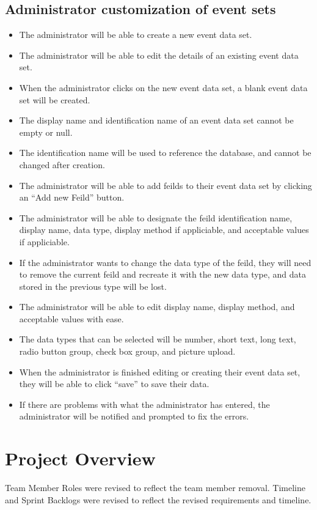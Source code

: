 \subsection{Administrator customization of event sets}
\begin{itemize}
\item The administrator will be able to create a new event data set.
\item The administrator will be able to edit the details of an existing event data set.
\item When the administrator clicks on the new event data set, a blank event data set will be created. 
\item The display name and identification name of an event data set cannot be empty or null.
\item The identification name will be used to reference the database, and cannot be changed after creation.
\item The administrator will be able to add feilds to their event data set by clicking an ``Add new Feild'' button.
\item The administrator will be able to designate the feild identification name, display name, data type, display method if appliciable, and acceptable values if appliciable. 
\item If the administrator wants to change the data type of the feild, they will need to remove the current feild and recreate it with the new data type, and data stored in the previous type will be lost.
\item The administrator will be able to edit display name, display method, and acceptable values with ease.
\item The data types that can be selected will be number, short text, long text, radio button group, check box group, and picture upload.
\item When the administrator is finished editing or creating their event data set, they will be able to click ``save'' to save their data. 
\item If there are problems with what the administrator has entered, the administrator will be notified and prompted to fix the errors.
\end{itemize}

\section{Project Overview}
Team Member Roles were revised to reflect the team member removal. Timeline and Sprint Backlogs were revised to reflect the revised requirements and timeline.
